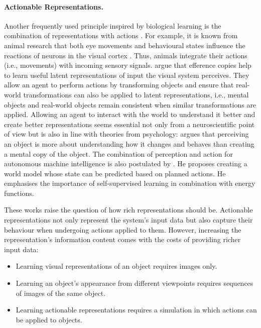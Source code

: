 \paragraph{Actionable Representations.} Another frequently used principle inspired by biological learning is the combination of representations with actions . For example, it is known from animal research that both eye movements and behavioural states influence the reactions of neurons in the visual cortex \cite{keller_sensorimotor_2012}.
Thus, animals integrate their actions (i.e., movements) with incoming sensory signals.
 argue that efference copies help to learn useful latent representations of input the visual system perceives. They allow an agent to perform actions by transforming objects and ensure that real-world transformations can also be applied to latent representations, i.e., mental objects and real-world objects remain consistent when similar transformations are applied.
Allowing an agent to interact with the world to understand it better and create better representations seems essential not only from a neuroscientific point of view but is also in line with theories from psychology:
 argues that perceiving an object is more about understanding how it changes and behaves than creating a mental copy of the object.
The combination of perception and action for autonomous machine intelligence is also postulated by . He proposes creating a world model whose state can be predicted based on planned actions. He emphasises the importance of self-supervised learning in combination with energy functions.

These works raise the question of how rich representations should be. Actionable representations not only represent the system's input data but also capture their behaviour when undergoing actions applied to them. However, increasing the representation's information content comes with the costs of providing richer input data:
\begin{itemize}
    \item Learning visual representations of an object requires images only.
    \item Learning an object's appearance from different viewpoints requires sequences of images of the same object.
    \item Learning actionable representations requires a simulation in which actions can be applied to objects. 
\end{itemize}

